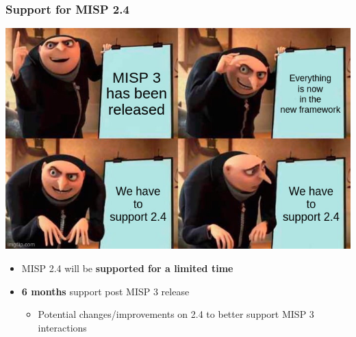 \begin{frame}
    \frametitle{Support for MISP 2.4}
    \vspace{-1em}
    \begin{center}
        \includegraphics[width=0.7\linewidth]{pictures/support-for-2.jpeg}
    \end{center}
    \vspace{-1em}
    \begin{itemize}
        \item MISP 2.4 will be \textbf{supported for a limited time}
        \item \textbf{6 months} support post MISP 3 release
        \begin{itemize}
            \item Potential changes/improvements on 2.4 to better support MISP 3 interactions
        \end{itemize}
    \end{itemize}
\end{frame}

